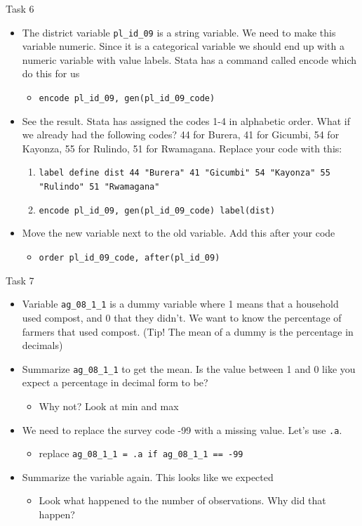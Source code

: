 \documentclass[aspectratio=169]{beamer}
\begin{document}
\begin{frame}{Task 6}
	\begin{itemize}
		\item The district variable \texttt{pl\_id\_09} is a string variable. We need to make this variable numeric. Since it is a categorical variable we should end up with a numeric variable with value labels. Stata has a command called encode which do this for us
		\begin{itemize}
			\item \texttt{encode  pl\_id\_09,  gen(pl\_id\_09\_code)}
		\end{itemize}
		\item See the result. Stata has assigned the codes 1-4 in alphabetic order. What if we already had the following codes? 44 for Burera, 41  for Gicumbi, 54 for Kayonza,  55 for Rulindo, 51 for Rwamagana. Replace your code with this:
		\begin{enumerate}
			\item 	\texttt{label define dist 44 "Burera" 41 "Gicumbi" 54 "Kayonza" 55 "Rulindo" 51 "Rwamagana"}
			\item   \texttt{encode  pl\_id\_09,  gen(pl\_id\_09\_code) label(dist)}
		\end{enumerate}
		\item Move the new variable next to the old variable. Add this after your code
		\begin{itemize}
			\item \texttt{order pl\_id\_09\_code, after(pl\_id\_09)}
		\end{itemize}
	\end{itemize}
\end{frame}

\begin{frame}{Task 7}
	\begin{itemize}
		\item Variable \texttt{ag\_08\_1\_1} is a dummy variable where 1 means that a household used compost, and 0 that they didn’t. We want to know the percentage of farmers that used compost. (Tip! The mean of a dummy is the percentage in decimals)
		\item Summarize \texttt{ag\_08\_1\_1} to get the mean. Is the value between 1 and 0 like you expect a percentage in decimal form to be?
			\begin{itemize}
				\item Why not? Look at min and max
			\end{itemize}
		\item We need to replace the survey code -99 with a missing value. Let’s use \texttt{.a}.
			\begin{itemize}
				\item replace \texttt{ag\_08\_1\_1 = .a if ag\_08\_1\_1 == -99}
			\end{itemize}
		\item Summarize the variable again. This looks like we expected
			\begin{itemize}
				\item Look what happened to the number of observations. Why did that happen?
			\end{itemize}
	\end{itemize}
\end{frame}
\end{document}
